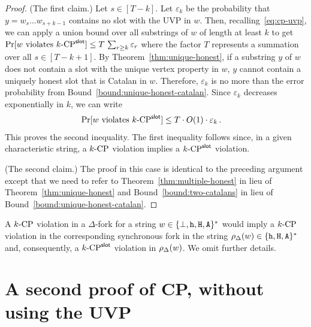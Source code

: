   \begin{proof}
    \newcommand{\EpsCat}{\mathsf{\varepsilon}}
    (The first claim.) 
    Let $s \in [T - k]$.
    Let $\EpsCat_{k}$ be 
    the probability that $y = w_s \ldots w_{s+k-1}$ contains no slot with the UVP in $w$. 
    Then, recalling~\eqref{eq:cp-uvp}, we can apply a union bound 
    over all substrings of $w$ of length at least $k$ to get 
    $
      \Pr[\text{$w$ violates $\kSlotCP$}] 
        \leq T\, \sum_{r \geq  k} \EpsCat_{r}
    $
    where the factor $T$ represents a summation over all $s \in [T - k + 1]$. 
    By Theorem~\ref{thm:unique-honest}, 
    if a substring $y$ of $w$ does not contain a slot with the unique vertex property in $w$, 
    $y$ cannot contain a uniquely honest slot that is Catalan in $w$.
    Therefore, $\EpsCat_k$ is no more than the error probability from Bound~\ref{bound:unique-honest-catalan}. 
    Since $\EpsCat_k$ decreases exponentially in $k$, 
    we can write 
    \begin{align*}
      \Pr[\text{$w$ violates $\kSlotCP$}] 
        &\leq T\cdot O(1) \cdot \EpsCat_{k}
        \,.
    \end{align*}
    This proves the second inequality. 
    The first inequality follows since, 
    in a given characteristic string, 
    a ${k}\text{-}\mathrm{CP}$ violation implies a ${k}\text{-}\mathrm{CP}^{\mathsf{slot}}$ violation.

    (The second claim.) 
    The proof in this case 
    is identical to the preceding argument except that 
    we need to refer to Theorem~\ref{thm:multiple-honest} in lieu of Theorem~\ref{thm:unique-honest}
    and Bound~\ref{bound:two-catalans} in lieu of Bound~\ref{bound:unique-honest-catalan}.
  \end{proof}
  A ${k}\text{-}\mathrm{CP}$ violation in a $\Delta$-fork for a string $w \in \{\perp, \mathtt{h}, \mathtt{H}, \mathtt{A}\}^*$ 
  would imply 
  a ${k}\text{-}\mathrm{CP}$ violation in the corresponding synchronous fork 
  in the string $\rho_\Delta(w) \in \{\mathtt{h}, \mathtt{H}, \mathtt{A}\}^*$ 
  and, consequently, a ${k}\text{-}\mathrm{CP}^{\mathsf{slot}}$ violation in $\rho_\Delta(w)$. 
  We omit further details.


\section{A second proof of CP, without using the UVP}\label{sec:cp-nocatalan-multihonest}

